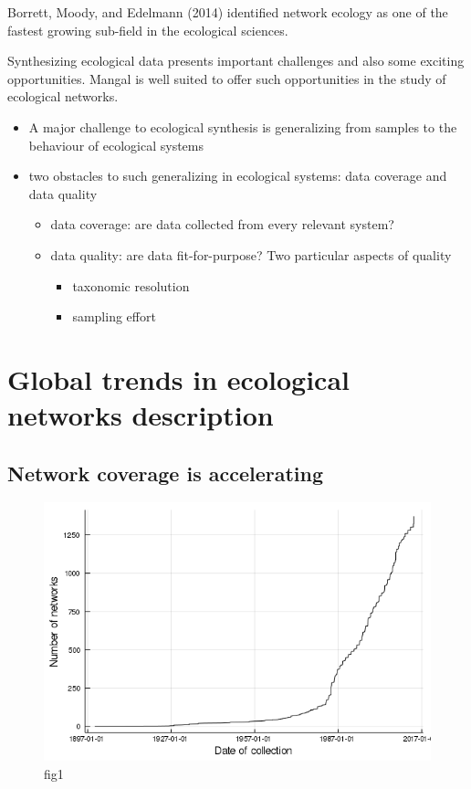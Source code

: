 Borrett, Moody, and Edelmann (2014) identified network ecology as one of
the fastest growing sub-field in the ecological sciences.

Synthesizing ecological data presents important challenges and also some
exciting opportunities. Mangal is well suited to offer such
opportunities in the study of ecological networks.

\begin{itemize}
\tightlist
\item
  A major challenge to ecological synthesis is generalizing from samples
  to the behaviour of ecological systems
\item
  two obstacles to such generalizing in ecological systems: data
  coverage and data quality

  \begin{itemize}
  \tightlist
  \item
    data coverage: are data collected from every relevant system?
  \item
    data quality: are data fit-for-purpose? Two particular aspects of
    quality

    \begin{itemize}
    \tightlist
    \item
      taxonomic resolution
    \item
      sampling effort
    \end{itemize}
  \end{itemize}
\end{itemize}

\hypertarget{global-trends-in-ecological-networks-description}{%
\section{Global trends in ecological networks
description}\label{global-trends-in-ecological-networks-description}}

\hypertarget{network-coverage-is-accelerating}{%
\subsection{Network coverage is
accelerating}\label{network-coverage-is-accelerating}}

\begin{figure}
\centering
\includegraphics{figures/figure_01_a.png}
\caption{fig1\label{fig:temporal}}
\end{figure}

